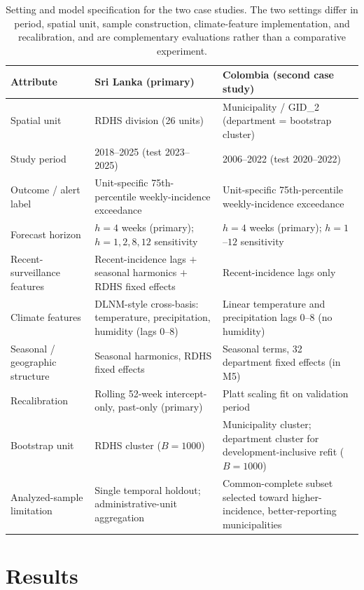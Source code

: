 \documentclass[11pt,a4paper]{article}
\begin{document}
\begin{table}[htbp]
\centering
\caption{Setting and model specification for the two case studies. The two settings differ in period, spatial unit, sample construction, climate-feature implementation, and recalibration, and are complementary evaluations rather than a comparative experiment.}
\label{tab:spec}
\footnotesize{}
\begin{tabularx}{\textwidth}{@{}p{3.3cm}YY@{}}
\toprule
Attribute & Sri Lanka (primary) & Colombia (second case study) \\
\midrule
Spatial unit & RDHS division (26 units) & Municipality / GID\_2 (department = bootstrap cluster) \\
Study period & 2018--2025 (test 2023--2025) & 2006--2022 (test 2020--2022) \\
Outcome / alert label & Unit-specific 75th-percentile weekly-incidence exceedance & Unit-specific 75th-percentile weekly-incidence exceedance \\
Forecast horizon & $h=4$ weeks (primary); $h=1,2,8,12$ sensitivity & $h=4$ weeks (primary); $h=1$--$12$ sensitivity \\
Recent-surveillance features & Recent-incidence lags $+$ seasonal harmonics $+$ RDHS fixed effects & Recent-incidence lags only \\
Climate features & DLNM-style cross-basis: temperature, precipitation, humidity (lags 0--8) & Linear temperature and precipitation lags 0--8 (no humidity) \\
Seasonal / geographic structure & Seasonal harmonics, RDHS fixed effects & Seasonal terms, 32 department fixed effects (in M5) \\
Recalibration & Rolling 52-week intercept-only, past-only (primary) & Platt scaling fit on validation period \\
Bootstrap unit & RDHS cluster ($B=1000$) & Municipality cluster; department cluster for development-inclusive refit ($B=1000$) \\
Analyzed-sample limitation & Single temporal holdout; administrative-unit aggregation & Common-complete subset selected toward higher-incidence, better-reporting municipalities \\
\bottomrule
\end{tabularx}
\end{table}

\section{Results}
\end{document}

